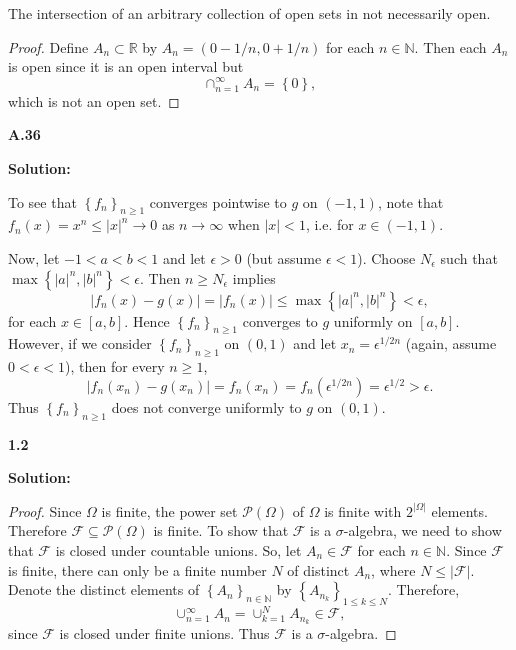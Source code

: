 \documentclass[12pt]{article}
\begin{document}
\begin{Proposition}
The intersection of an arbitrary collection of open sets in not necessarily open.
\end{Proposition}
\begin{proof}
Define $A_{n} \subset \mathbb{R}$ by $A_{n} = (0-1/n, 0 +1/n)$ for each $n \in \mathbb{N}$. Then each $A_{n}$ is open since it is an open interval but 
\[ \cap_{n=1}^{\infty}A_{n} = \left\{ 0 \right\}, \]
which is not an open set.
\end{proof}


{\bf A.36}

{\bf Solution:}

To see that $\left\{ f_{n} \right\}_{n\geq 1}$ converges pointwise to $g$ on $(-1,1)$, note that $f_{n}(x) = x^{n} \leq |x|^{n} \rightarrow 0$ as
$n\rightarrow \infty$ when $|x| < 1$, i.e. for $x \in (-1, 1)$.

Now, let $-1 < a < b < 1$ and let $\epsilon > 0$ (but assume $\epsilon < 1$). Choose $N_{\epsilon}$ such that $\max\left\{ |a|^{n}, |b|^{n} \right\} < \epsilon$. Then $n \geq
N_{\epsilon}$ implies 
\[ |f_{n}(x) - g(x)| = |f_{n}(x)| \leq \max\left\{ |a|^{n}, |b|^{n} \right\} < \epsilon, \]
for each $x \in [a,b]$. Hence $\left\{ f_{n} \right\}_{n\geq 1}$ converges to $g$ uniformly on $[a,b]$. However, if we consider $\left\{ f_{n}
\right\}_{n\geq 1}$ on $(0,1)$ and let $x_{n} = \epsilon^{1/2n}$ (again, assume $0 < \epsilon < 1$), then for every $n \geq 1$,
\[ |f_{n}(x_{n}) - g(x_{n})| = f_{n}(x_{n}) = f_{n}(\epsilon^{1/2n}) = \epsilon^{1/2} > \epsilon. \]
Thus $\left\{ f_{n} \right\}_{n\geq 1}$ does not converge uniformly to $g$ on $(0, 1)$.


{\bf 1.2}

{\bf Solution:}

\begin{proof}
Since $\Omega$ is finite, the power set $\mathcal{P}(\Omega)$ of $\Omega$ is finite with $2^{|\Omega|}$ elements. Therefore $\mathcal{F} \subseteq \mathcal{P}(\Omega)$ is
finite. To show that $\mathcal{F}$ is a $\sigma$-algebra, we need to show that $\mathcal{F}$ is closed under countable unions. So, let $A_{n} \in
\mathcal{F}$ for each $n \in \mathbb{N}$. Since $\mathcal{F}$ is finite, there can only be a finite number $N$ of distinct $A_{n}$, where $N \leq
|\mathcal{F}|$. Denote the distinct elements of $\left\{ A_{n}
\right\}_{n\in\mathbb{N}}$ by $\left\{ A_{n_{k}} \right\}_{1\leq k \leq N}$. Therefore,
\[ \cup_{n=1}^{\infty}A_{n} = \cup_{k=1}^{N}A_{n_{k}} \in \mathcal{F}, \]
since $\mathcal{F}$ is closed under finite unions. Thus $\mathcal{F}$ is a $\sigma$-algebra.
\end{proof}
\end{document}
